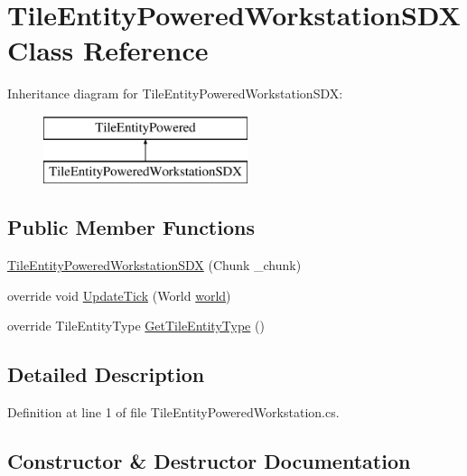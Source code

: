 \hypertarget{class_tile_entity_powered_workstation_s_d_x}{}\section{Tile\+Entity\+Powered\+Workstation\+S\+DX Class Reference}
\label{class_tile_entity_powered_workstation_s_d_x}
Inheritance diagram for Tile\+Entity\+Powered\+Workstation\+S\+DX\+:\begin{figure}[H]
\begin{center}
\leavevmode
\includegraphics[height=2.000000cm]{class_tile_entity_powered_workstation_s_d_x}
\end{center}
\end{figure}
\subsection*{Public Member Functions}
\begin{DoxyCompactItemize}
\item 
\mbox{\hyperlink{class_tile_entity_powered_workstation_s_d_x_a292fe991ecfb4aa5b17568dbe2fa9d54}{Tile\+Entity\+Powered\+Workstation\+S\+DX}} (Chunk \+\_\+chunk)
\item 
override void \mbox{\hyperlink{class_tile_entity_powered_workstation_s_d_x_a7bdf58d110502b7e49b3fa83d566b40e}{Update\+Tick}} (World \mbox{\hyperlink{_sphere_i_i_01_music_01_boxes_2_config_2_localization_8txt_a7ede01351426b1b7f6c1ce5f794e474f}{world}})
\item 
override Tile\+Entity\+Type \mbox{\hyperlink{class_tile_entity_powered_workstation_s_d_x_a061cabab272b38180da470223feeeb5d}{Get\+Tile\+Entity\+Type}} ()
\end{DoxyCompactItemize}


\subsection{Detailed Description}


Definition at line 1 of file Tile\+Entity\+Powered\+Workstation.\+cs.



\subsection{Constructor \& Destructor Documentation}
\mbox{\label{class_tile_entity_powered_workstation_s_d_x_a292fe991ecfb4aa5b17568dbe2fa9d54}} 
